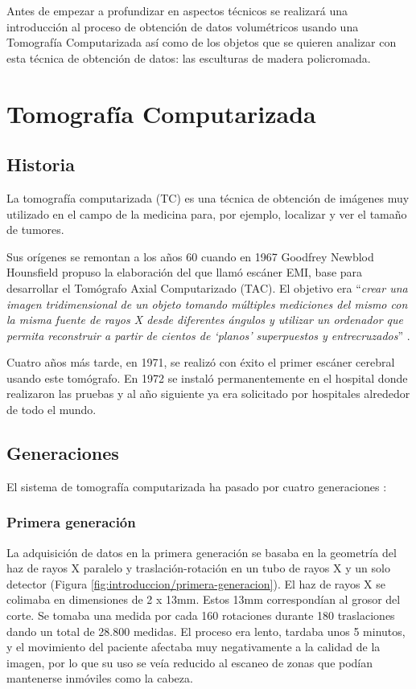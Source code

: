 Antes de empezar a profundizar en aspectos técnicos se realizará una introducción al proceso de obtención de datos volumétricos usando una Tomografía Computarizada así como de los objetos que se quieren analizar con esta técnica de obtención de datos: las esculturas de madera policromada.

\section{Tomografía Computarizada}

\subsection{Historia}

La tomografía computarizada (TC) es una técnica de obtención de imágenes muy utilizado en el campo de la medicina para, por ejemplo, localizar y ver el tamaño de tumores.

Sus orígenes se remontan a los años 60 cuando en 1967 Goodfrey Newblod Hounsfield propuso la elaboración del que llamó escáner EMI, base para desarrollar el Tomógrafo Axial Computarizado (TAC). El objetivo era ``\textit{crear una imagen tridimensional de un objeto tomando múltiples mediciones del mismo con la misma fuente de rayos X desde diferentes ángulos y utilizar un ordenador que permita reconstruir a partir de cientos de `planos' superpuestos y entrecruzados}'' \cite{gonzales11}.

Cuatro años más tarde, en 1971, se realizó con éxito el primer escáner cerebral usando este tomógrafo. En 1972 se instaló permanentemente en el hospital donde realizaron las pruebas y al año siguiente ya era solicitado por hospitales alrededor de todo el mundo.

\subsection{Generaciones}

El sistema de tomografía computarizada ha pasado por cuatro generaciones \cite{sarrio16}:

\subsubsection{Primera generación}

La adquisición de datos en la primera generación se basaba en la geometría del haz de rayos X paralelo y traslación-rotación en un tubo de rayos X y un solo detector (Figura \ref{fig:introduccion/primera-generacion}). El haz de rayos X se colimaba en dimensiones de 2 x 13mm. Estos 13mm correspondían al grosor del corte. Se tomaba una medida por cada 160 rotaciones durante 180 traslaciones dando un total de 28.800 medidas. El proceso era lento, tardaba unos 5 minutos, y el movimiento del paciente afectaba muy negativamente a la calidad de la imagen, por lo que su uso se veía reducido al escaneo de zonas que podían mantenerse inmóviles como la cabeza.

